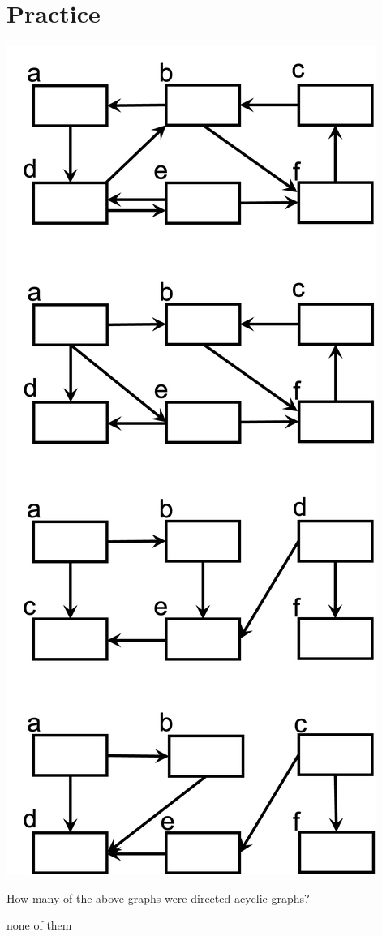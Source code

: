 \documentclass[11  pt]{exam}
\begin{document}
	\section{Practice}
	\includegraphics[width = .6\linewidth]{manydfs.png}
	\newpage
	\begin{Qu}
		How many of the above graphs were directed acyclic graphs?
		\begin{itemize}
			\eitem none of them
		\end{itemize}
	\end{Qu}
	
\end{document}
